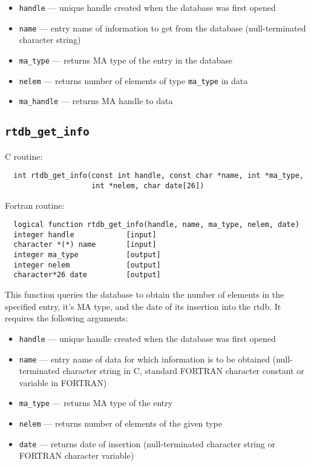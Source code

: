 \begin{itemize}  
\item {\tt handle} --- unique handle created when the database was first opened
\item {\tt name} --- entry name of information to get from the database (null-terminated character string)
\item {\tt ma\_type} --- returns MA type of the entry in the database
\item {\tt nelem} --- returns number of elements of type {\tt ma\_type} in data
\item {\tt ma\_handle} --- returns MA handle to data
\end{itemize}


\subsection{{\tt rtdb\_get\_info}}

C routine:

\begin{verbatim}
  int rtdb_get_info(const int handle, const char *name, int *ma_type, 
                    int *nelem, char date[26])
\end{verbatim}


Fortran routine:

\begin{verbatim}
  logical function rtdb_get_info(handle, name, ma_type, nelem, date)
  integer handle            [input]
  character *(*) name       [input]
  integer ma_type           [output]
  integer nelem             [output]
  character*26 date         [output]
\end{verbatim}

This function queries the database to obtain the number of elements in the
specified entry, it's MA type, and the date of its insertion into the rtdb.
It requires the following arguments:

\begin{itemize}
\item {\tt handle} --- unique handle created when the database was first opened
\item {\tt name} --- entry name of data for which information is to be obtained
(null-terminated character string in
  C,  standard FORTRAN character constant or variable in FORTRAN)
\item {\tt ma\_type} --- returns MA type of the entry
\item {\tt nelem} --- returns number of elements of the given type
\item {\tt date} --- returns date of insertion (null-terminated
  character string or FORTRAN character variable)
\end{itemize}

